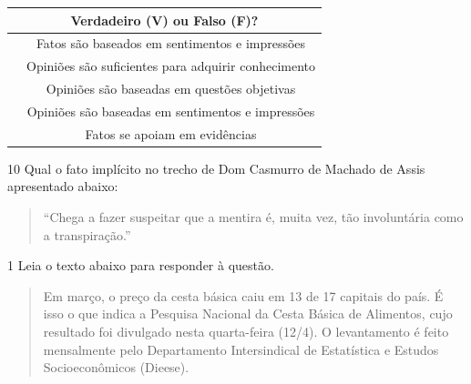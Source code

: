 \begin{table}[]
\begin{tabular}{|lc|}
\hline
\multicolumn{2}{|c|}{\cellcolor[HTML]{DAE8FC}\textbf{Verdadeiro (V) ou Falso (F)?}} \\ \hline
\multicolumn{1}{|l|}{}     & Fatos são baseados em sentimentos e impressões         \\ \hline
\multicolumn{1}{|l|}{}     & Opiniões são suficientes para adquirir conhecimento    \\ \hline
\multicolumn{1}{|l|}{}     & Opiniões são baseadas em questões objetivas            \\ \hline
\multicolumn{1}{|l|}{}     & Opiniões são baseadas em sentimentos e impressões      \\ \hline
\multicolumn{1}{|l|}{}     & Fatos se apoiam em evidências                          \\ \hline
\end{tabular}
\end{table}


\num{10} Qual o fato implícito no trecho de Dom Casmurro de Machado de Assis apresentado abaixo:

\begin{quote}

``Chega a fazer suspeitar que a mentira é, muita vez, tão involuntária
como a transpiração.''

\end{quote}



\num{1} Leia o texto abaixo para responder à questão.

\begin{quote}

Em março, o preço da cesta básica caiu em 13 de 17 capitais do país. É
isso o que indica a Pesquisa Nacional da Cesta Básica de Alimentos, cujo
resultado foi divulgado nesta quarta-feira (12/4). O levantamento é
feito mensalmente pelo Departamento Intersindical de Estatística e
Estudos Socioeconômicos (Dieese).

\end{quote}

